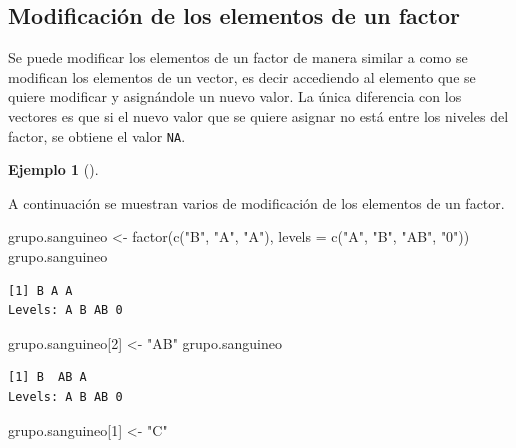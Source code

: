 \documentclass[
  spanish,
  a4paper,
]{scrreport}
\newenvironment{Shaded}{\begin{snugshade}}{\end{snugshade}}
\newcommand{\AttributeTok}[1]{\textcolor[rgb]{0.40,0.45,0.13}{#1}}
\newcommand{\DecValTok}[1]{\textcolor[rgb]{0.68,0.00,0.00}{#1}}
\newcommand{\FunctionTok}[1]{\textcolor[rgb]{0.28,0.35,0.67}{#1}}
\newcommand{\NormalTok}[1]{\textcolor[rgb]{0.00,0.23,0.31}{#1}}
\newcommand{\OtherTok}[1]{\textcolor[rgb]{0.00,0.23,0.31}{#1}}
\newcommand{\StringTok}[1]{\textcolor[rgb]{0.13,0.47,0.30}{#1}}
\theoremstyle{definition}
\theoremstyle{definition}
\newtheorem{example}{Ejemplo}[chapter]
\theoremstyle{remark}
\begin{document}
\subsection{Modificación de los elementos de un
factor}\label{modificaciuxf3n-de-los-elementos-de-un-factor}

Se puede modificar los elementos de un factor de manera similar a como
se modifican los elementos de un vector, es decir accediendo al elemento
que se quiere modificar y asignándole un nuevo valor. La única
diferencia con los vectores es que si el nuevo valor que se quiere
asignar no está entre los niveles del factor, se obtiene el valor
\texttt{NA}.

\begin{example}[]\protect\hypertarget{exm-modificacion-factor}{}\label{exm-modificacion-factor}

A continuación se muestran varios de modificación de los elementos de un
factor.

\begin{Shaded}
\begin{Highlighting}[]
\NormalTok{grupo.sanguineo }\OtherTok{\textless{}{-}} \FunctionTok{factor}\NormalTok{(}\FunctionTok{c}\NormalTok{(}\StringTok{"B"}\NormalTok{, }\StringTok{"A"}\NormalTok{, }\StringTok{"A"}\NormalTok{), }\AttributeTok{levels =} \FunctionTok{c}\NormalTok{(}\StringTok{"A"}\NormalTok{, }\StringTok{"B"}\NormalTok{, }\StringTok{"AB"}\NormalTok{, }\StringTok{"0"}\NormalTok{))}
\NormalTok{grupo.sanguineo}
\end{Highlighting}
\end{Shaded}

\begin{verbatim}
[1] B A A
Levels: A B AB 0
\end{verbatim}

\begin{Shaded}
\begin{Highlighting}[]
\NormalTok{grupo.sanguineo[}\DecValTok{2}\NormalTok{] }\OtherTok{\textless{}{-}} \StringTok{"AB"}
\NormalTok{grupo.sanguineo}
\end{Highlighting}
\end{Shaded}

\begin{verbatim}
[1] B  AB A 
Levels: A B AB 0
\end{verbatim}

\begin{Shaded}
\begin{Highlighting}[]
\NormalTok{grupo.sanguineo[}\DecValTok{1}\NormalTok{] }\OtherTok{\textless{}{-}} \StringTok{"C"}
\end{Highlighting}
\end{Shaded}


\end{example}
\end{document}
